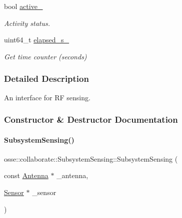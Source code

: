 \begin{DoxyCompactItemize}
bool \hyperlink{classosse_1_1collaborate_1_1_subsystem_sensing_a5ccb7693a3282609ef174c866032b7ba}{active\+\_\+}
\begin{DoxyCompactList}\small\item\em Activity status. \end{DoxyCompactList}\item 
\mbox{\label{classosse_1_1collaborate_1_1_subsystem_sensing_a81f649b8d63d894a9d44a1657f7bf4c7}} 
uint64\+\_\+t \hyperlink{classosse_1_1collaborate_1_1_subsystem_sensing_a81f649b8d63d894a9d44a1657f7bf4c7}{elapsed\+\_\+s\+\_\+}
\begin{DoxyCompactList}\small\item\em Get time counter (seconds) \end{DoxyCompactList}\end{DoxyCompactItemize}


\subsubsection{Detailed Description}
An interface for RF sensing. 

\subsubsection{Constructor \& Destructor Documentation}
\mbox{\label{classosse_1_1collaborate_1_1_subsystem_sensing_a86a15f70b159a115f6682a795cba3b13}} 
\paragraph{\texorpdfstring{Subsystem\+Sensing()}{SubsystemSensing()}}
{\footnotesize\ttfamily osse\+::collaborate\+::\+Subsystem\+Sensing\+::\+Subsystem\+Sensing (\begin{DoxyParamCaption}\item[{const \hyperlink{classosse_1_1collaborate_1_1_antenna}{Antenna} $\ast$}]{\+\_\+antenna,  }\item[{\hyperlink{classosse_1_1collaborate_1_1_sensor}{Sensor} $\ast$}]{\+\_\+sensor }\end{DoxyParamCaption})}



